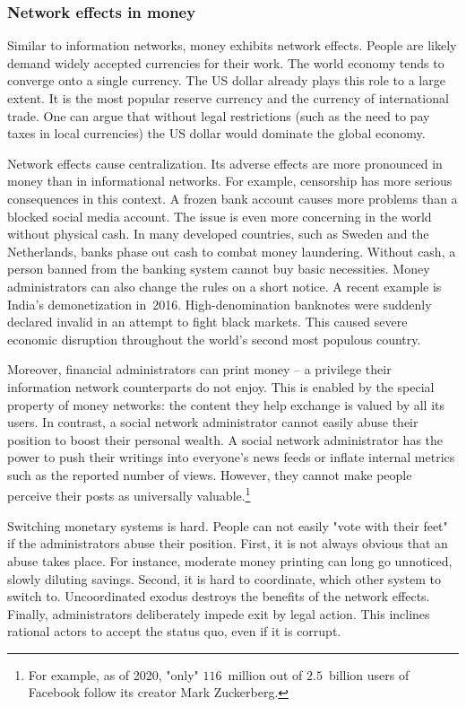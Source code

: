 \subsubsection*{Network effects in money}

Similar to information networks, money exhibits network effects.
People are likely demand widely accepted currencies for their work.
The world economy tends to converge onto a single currency.
The US dollar already plays this role to a large extent.
It is the most popular reserve currency and the currency of international trade.
One can argue that without legal restrictions (such as the need to pay taxes in local currencies) the US dollar would dominate the global economy.

Network effects cause centralization.
Its adverse effects are more pronounced in money than in informational networks.
For example, censorship has more serious consequences in this context.
A frozen bank account causes more problems than a blocked social media account.
The issue is even more concerning in the world without physical cash.
In many developed countries, such as Sweden and the Netherlands, banks phase out cash to combat money laundering.
Without cash, a person banned from the banking system cannot buy basic necessities.
Money administrators can also change the rules on a short notice.
A recent example is India's demonetization in~2016.
High-denomination banknotes were suddenly declared invalid in an attempt to fight black markets.
This caused severe economic disruption throughout the world's second most populous country.

Moreover, financial administrators can print money -- a privilege their information network counterparts do not enjoy.
This is enabled by the special property of money networks: the content they help exchange is valued by all its users.
In contrast, a social network administrator cannot easily abuse their position to boost their personal wealth.
A social network administrator has the power to push their writings into everyone's news feeds or inflate internal metrics such as the reported number of views.
However, they cannot make people perceive their posts as universally valuable.\footnote{For example, as of 2020, "only" $116$~million out of $2.5$~billion users of Facebook follow its creator Mark Zuckerberg.}

Switching monetary systems is hard.
People can not easily "vote with their feet" if the administrators abuse their position.
First, it is not always obvious that an abuse takes place.
For instance, moderate money printing can long go unnoticed, slowly diluting savings.
Second, it is hard to coordinate, which other system to switch to.
Uncoordinated exodus destroys the benefits of the network effects.
Finally, administrators deliberately impede exit by legal action.
This inclines rational actors to accept the status quo, even if it is corrupt.

